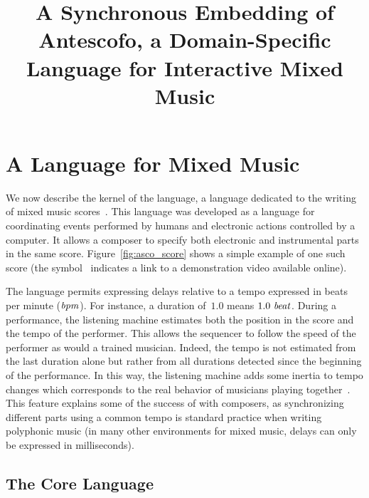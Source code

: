 \documentclass[preprint]{sigplanconf}
\title{A Synchronous Embedding of Antescofo, a Domain-Specific Language for Interactive Mixed Music}
\begin{document}
\maketitle

\section{A Language for Mixed Music}
\label{sec:antescofo}

We now describe the kernel of the \Antescofo language, a language
dedicated to the writing of mixed music
scores~\cite{echeveste2012antescofo}. This language was developed as a
language for coordinating events performed by humans and electronic
actions controlled by a computer.  It allows a composer to specify
both electronic and instrumental parts in the same
score. Figure~\ref{fig:asco_score} shows a simple example of one such
score (the symbol~\video{} indicates a link to a demonstration video
available online).

The language permits expressing delays relative to a tempo expressed
in beats per minute (${{\mbox{\emph{bpm}}}}$). For instance, a duration of~$1.0$
means ${1.0\ {{\mbox{\emph{beat}}}}}$. During a performance, the listening machine
estimates both the position in the score and the tempo of the
performer. This allows the sequencer to follow the speed of the
performer as would a trained musician. Indeed, the tempo is not
estimated from the last duration alone but rather from all durations
detected since the beginning of the performance. In this way, the
listening machine adds some inertia to tempo changes which corresponds
to the real behavior of musicians playing
together~\cite{cont2008antescofo}.  This feature explains some of the
success of \Antescofo with composers, as synchronizing different parts
using a common tempo is standard practice when writing polyphonic
music (in many other environments for mixed music, delays can only be
expressed in milliseconds).




\subsection{The Core Language}
\label{sec:language}
\end{document}
